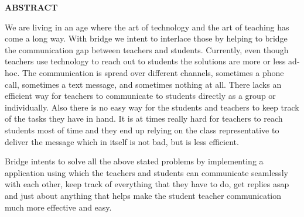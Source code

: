 \vspace{2in}

\centerline{\large{\bfseries{ABSTRACT}}}

\hspace{1in}

\normalsize
We are living in an age where the art of technology and the art of teaching has come a long way. With bridge we intent to interlace those by helping to bridge the communication gap between teachers and students. Currently, even though teachers use technology to reach out to students the solutions are more or less ad-hoc. The communication is spread over different channels, sometimes a phone call, sometimes a text message, and sometimes nothing at all. There lacks an efficient way for teachers to communicate to students directly as a group or individually. Also there is no easy way for the students and teachers to keep track of the tasks they have in hand. It is at times really hard for teachers to reach students most of time and they end up relying on the class representative to deliver the message which in itself is not bad, but is less efficient.

Bridge intents to solve all the above stated problems by implementing a application using which the teachers and students can communicate seamlessly with each other, keep track of everything that they have to do, get replies asap and just about anything that helps make the student teacher communication much more effective and easy.

